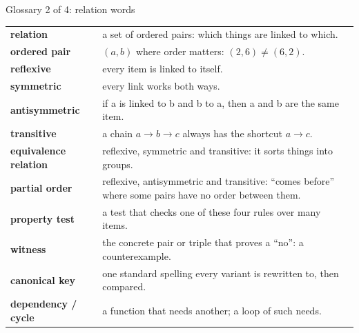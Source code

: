 \begin{frame}{Glossary 2 of 4: relation words}
\small
\begin{tabular}{@{}p{3.2cm}p{9.4cm}@{}}
\textbf{relation} & a set of ordered pairs: which things are linked to which.\\
\textbf{ordered pair} & $(a,b)$ where order matters: $(2,6)\neq(6,2)$.\\
\textbf{reflexive} & every item is linked to itself.\\
\textbf{symmetric} & every link works both ways.\\
\textbf{antisymmetric} & if a is linked to b and b to a, then a and b are the same item.\\
\textbf{transitive} & a chain $a\to b\to c$ always has the shortcut $a\to c$.\\
\textbf{equivalence relation} & reflexive, symmetric and transitive: it sorts things into groups.\\
\textbf{partial order} & reflexive, antisymmetric and transitive: ``comes before'' where some pairs have no order between them.\\
\textbf{property test} & a test that checks one of these four rules over many items.\\
\textbf{witness} & the concrete pair or triple that proves a ``no'': a counterexample.\\
\textbf{canonical key} & one standard spelling every variant is rewritten to, then compared.\\
\textbf{dependency / cycle} & a function that needs another; a loop of such needs.\\
\end{tabular}
\end{frame}

